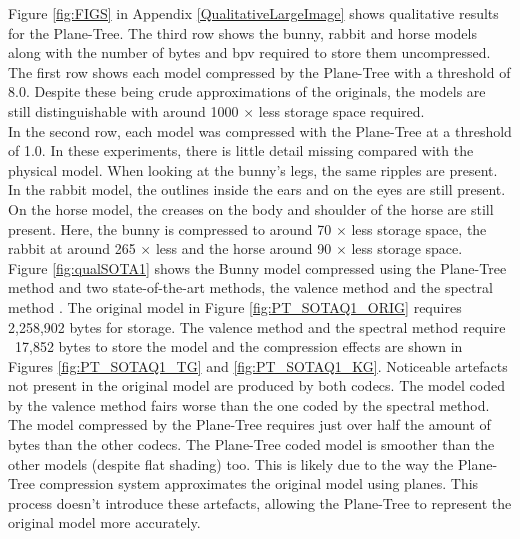
Figure \ref{fig:FIGS} in Appendix \ref{QualitativeLargeImage} shows qualitative results for the Plane-Tree. The third row shows the bunny, rabbit and horse models along with the number of bytes and bpv required to store them uncompressed. The first row shows each model compressed by the Plane-Tree with a threshold of 8.0. Despite these being crude approximations of the originals, the models are still distinguishable with around 1000 $\times$ less storage space required. \\

In the second row, each model was compressed with the Plane-Tree at a threshold of 1.0. In these experiments, there is little detail missing compared with the physical model. When looking at the bunny's legs, the same ripples are present. In the rabbit model, the outlines inside the ears and on the eyes are still present. On the horse model, the creases on the body and shoulder of the horse are still present. Here, the bunny is compressed to around 70 $\times$ less storage space, the rabbit at around 265 $\times$ less and the horse around 90 $\times$ less storage space. \\


Figure \ref{fig:qualSOTA1} shows the Bunny model compressed using the Plane-Tree method and two state-of-the-art methods, the valence method \cite{touma98triangle} and the spectral method \cite{Karni00Spectral}. The original model in Figure \ref{fig:PT_SOTAQ1_ORIG} requires 2,258,902 bytes for storage. The valence method and the spectral method require ~17,852 bytes to store the model and the compression effects are shown in Figures \ref{fig:PT_SOTAQ1_TG} and \ref{fig:PT_SOTAQ1_KG}. Noticeable artefacts not present in the original model are produced by both codecs. The model coded by the valence method fairs worse than the one coded by the spectral method. The model compressed by the Plane-Tree requires just over half the amount of bytes than the other codecs. The Plane-Tree coded model is smoother than the other models (despite flat shading) too. This is likely due to the way the Plane-Tree compression system approximates the original model using planes. This process doesn't introduce these artefacts, allowing the Plane-Tree to represent the original model more accurately. \\   

